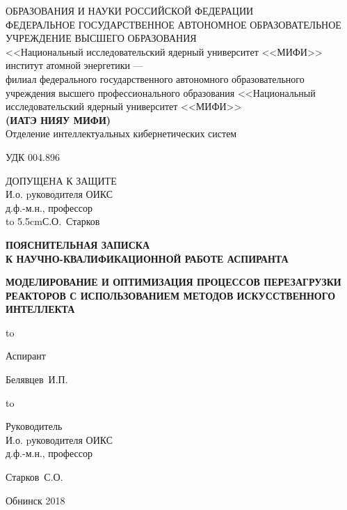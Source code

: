 \thispagestyle{empty}

\begin{center}
{ ОБРАЗОВАНИЯ И НАУКИ РОССИЙСКОЙ ФЕДЕРАЦИИ\\
ФЕДЕРАЛЬНОЕ ГОСУДАРСТВЕННОЕ АВТОНОМНОЕ ОБРАЗОВАТЕЛЬНОЕ УЧРЕЖДЕНИЕ ВЫСШЕГО ОБРАЗОВАНИЯ\\
<<Национальный исследовательский ядерный университет <<МИФИ>>\\
{ институт атомной энергетики ---}\\
филиал федерального государственного автономного образовательного\\
учреждения высшего профессионального образования <<Национальный\\
исследовательский ядерный университет <<МИФИ>>\\
{\bf(ИАТЭ НИЯУ МИФИ)}}\\ 

\vspace{2em}
Отделение интеллектуальных кибернетических систем
\end{center}
\vspace{2em}
УДК 004.896
\hfill
\parbox{5.5cm}
{
ДОПУЩЕНА К ЗАЩИТЕ\\
И.о. pуководителя ОИКС\\
д.ф.-м.н., профессор\\
\hbox to 5.5cm{\dotfill С.О.~Старков}
}
\vspace{5em}
\begin{center}
\textbf{ПОЯСНИТЕЛЬНАЯ ЗАПИСКА\\ К НАУЧНО-КВАЛИФИКАЦИОННОЙ РАБОТЕ АСПИРАНТА}
\end{center}


\begin{center}
\bf
МОДЕЛИРОВАНИЕ И ОПТИМИЗАЦИЯ ПРОЦЕССОВ ПЕРЕЗАГРУЗКИ РЕАКТОРОВ С ИСПОЛЬЗОВАНИЕМ МЕТОДОВ ИСКУССТВЕННОГО ИНТЕЛЛЕКТА
\end{center}

\vspace{6em}

\hbox to \textwidth
{\parbox{6 cm}{Аспирант}\dotfill \parbox{4 cm}{
\begin{flushright}Белявцев~И.П.\end{flushright}}}
\vspace{2em}

\hbox to \textwidth
{\parbox{6 cm}{Руководитель\\ И.о. pуководителя ОИКС\\ д.ф.-м.н., профессор}\dotfill \parbox{4 cm}{
\begin{flushright}Старков~С.О.\end{flushright}}}
\vspace{2em}


\vspace{\fill}

\begin{center}
Обнинск 2018
\end{center}

\newpage